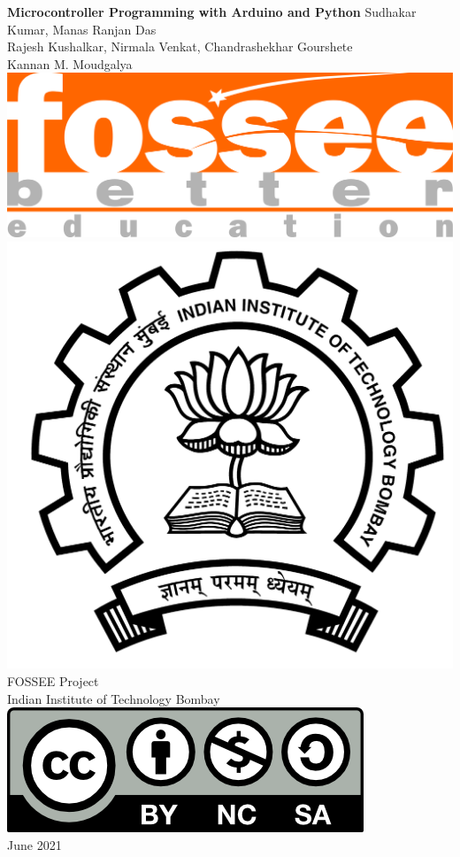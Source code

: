 \begin{center}
    {\bf {\Huge Microcontroller Programming with Arduino and Python}}
    \vfill
    Sudhakar Kumar, Manas Ranjan Das \\
    Rajesh Kushalkar, Nirmala Venkat, Chandrashekhar Gourshete \\
    Kannan M. Moudgalya \\
    \vfill
    \includegraphics[width=0.3\linewidth]{suppl/fossee_logo_hi.png} \quad
    \includegraphics[width=0.2\linewidth]{suppl/IITB-logo-HighRes.png} \\
    FOSSEE Project \\
    Indian Institute of Technology Bombay \\ [2mm]
    \includegraphics[width=0.15\linewidth]{suppl/by-nc-sa.png} \\ [1mm]
    June 2021
\end{center}

\clearpage
